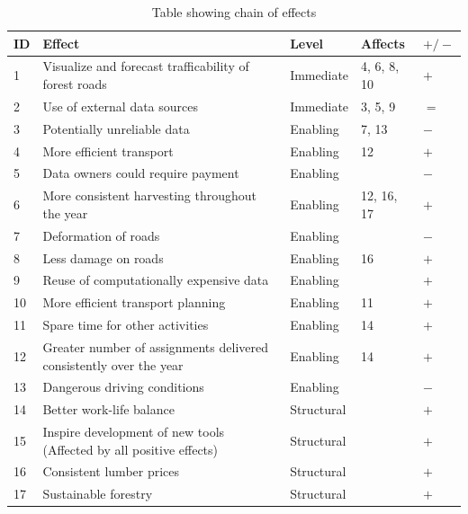 \begin{table}[h]
    \centering
    \renewcommand{\arraystretch}{1}
    \begin{tabularx}{\textwidth}{|l|X|l|l|l|}
        \hline
        \rowcolor{gray!20}
        \textbf{ID} & \textbf{Effect} & \textbf{Level} & \textbf{Affects} & \textbf{$+/-$} \\ 
        \hline
         1 & Visualize and forecast trafficability of forest roads & Immediate & 4, 6, 8, 10 & $+$ \\
         \hline
         2 & Use of external data sources & Immediate & 3, 5, 9 & $=$ \\
         \hline
         3 & Potentially unreliable data & Enabling & 7, 13 & $-$ \\
         \hline
         4 & More efficient transport & Enabling & 12 & $+$ \\
         \hline
         5 & Data owners could require payment & Enabling &  & $-$ \\
         \hline
         6 & More consistent harvesting throughout the year & Enabling & 12, 16, 17 & $+$ \\
         \hline
         7 & Deformation of roads & Enabling & & $-$ \\
         \hline
         8 & Less damage on roads & Enabling & 16 & $+$ \\
         \hline
         9 & Reuse of computationally expensive data & Enabling & & $+$ \\
         \hline
         10 & More efficient transport planning & Enabling & 11 & $+$ \\
         \hline
         11 & Spare time for other activities & Enabling & 14 & $+$ \\
         \hline
         12 & Greater number of assignments delivered consistently over the year & Enabling & 14 & $+$ \\
         \hline
         13 & Dangerous driving conditions & Enabling & & $-$ \\
         \hline
         14 & Better work-life balance & Structural & & $+$ \\
         \hline
         15 & Inspire development of new tools (Affected by all positive effects) & Structural & & $+$ \\
         \hline
         16 & Consistent lumber prices & Structural & & $+$ \\
         \hline
         17 & Sustainable forestry & Structural & & $+$ \\
         \hline
    \end{tabularx}
    \caption{Table showing chain of effects}
    \label{tab:chain_of_effects}
\end{table}

